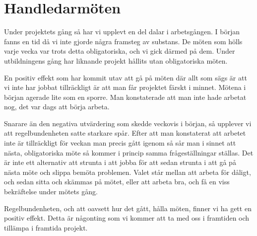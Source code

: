 \section{Handledarmöten}
Under projektets gång så har vi upplevt en del dalar i arbetsgången. I början fanns en tid då vi inte gjorde några framsteg av substans. De möten som hölls varje vecka var trots detta obligatoriska, och vi gick därmed på dem. Under utbildningens gång har liknande projekt hållits utan obligatoriska möten. 

En positiv effekt som har kommit utav att gå på möten där allt som sägs är att vi inte har jobbat tillräckligt är att man får projektet färskt i minnet. Mötena i början agerade lite som en sporre. Man konstaterade att man inte hade arbetat nog, det var dags att börja arbeta. 

Snarare än den negativa utvärdering som skedde veckovis i början, så upplever vi att regelbundenheten satte starkare spår. Efter att man konstaterat att arbetet inte är tillräckligt för veckan man precis gått igenom så sår man i sinnet att nästa, obligatoriska möte så kommer i princip samma frågeställningar ställas. Det är inte ett alternativ att strunta i att jobba för att sedan strunta i att gå på nästa möte och slippa bemöta problemen. Valet står mellan att arbeta för dåligt, och sedan sitta och skämmas på mötet, eller att arbeta bra, och få en viss bekräftelse under mötets gång. 

Regelbundenheten, och att oavsett hur det gått, hålla möten, finner vi ha gett en positiv effekt. Detta är någonting som vi kommer att ta med oss i framtiden och tillämpa i framtida projekt. 
